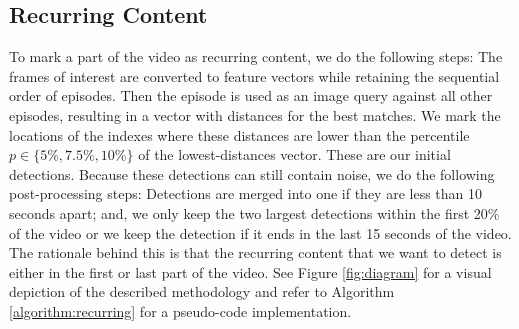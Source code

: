 \documentclass{report}
\begin{document}
\subsection{Recurring Content}
To mark a part of the video as recurring content, we do the following steps: The frames of interest are converted to feature vectors while retaining the sequential order of episodes. Then the episode is used as an image query against all other episodes, resulting in a vector with distances for the best matches. We mark the locations of the indexes where these distances are lower than the percentile $p \in \{5\%, 7.5\%, 10\%\}$ of the lowest-distances vector. These are our initial detections. Because these detections can still contain noise, we do the following post-processing steps: Detections are merged into one if they are less than 10 seconds apart; and, we only keep the two largest detections within the first 20\% of the video or we keep the detection if it ends in the last 15 seconds of the video. The rationale behind this is that the recurring content that we want to detect is either in the first or last part of the video. See Figure \ref{fig:diagram} for a visual depiction of the described methodology and refer to Algorithm \ref{algorithm:recurring} for a pseudo-code implementation.
\end{document}
